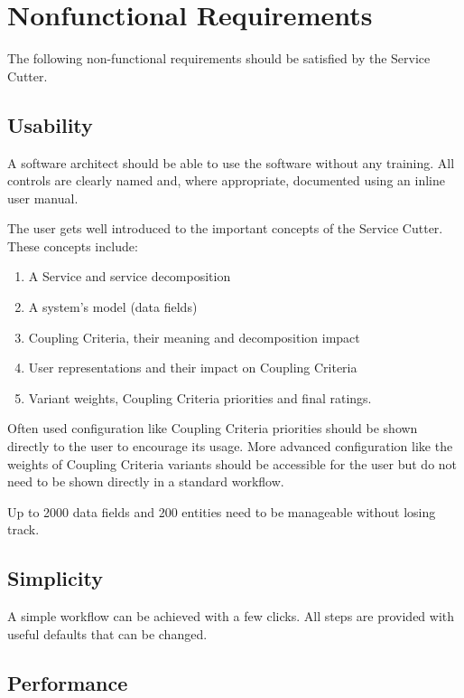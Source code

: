 \section{Nonfunctional Requirements}

The following non-functional requirements should be satisfied by the Service Cutter.

\subsection{Usability}
\label{sec:usability}

A software architect should be able to use the software without any training. All controls are clearly named and, where appropriate, documented using an inline user manual.

The user gets well introduced to the important concepts of the Service Cutter. These concepts include:

\begin{enumerate}
	\item A Service and service decomposition
	\item A system's model (data fields)
	\item Coupling Criteria, their meaning and decomposition impact
	\item User representations and their impact on Coupling Criteria
	\item Variant weights, Coupling Criteria priorities and final ratings.
\end{enumerate}

Often used configuration like Coupling Criteria priorities should be shown directly to the user to encourage its usage. More advanced configuration like the weights of Coupling Criteria variants should be accessible for the user but do not need to be shown directly in a standard workflow. 

Up to 2000 data fields and 200 entities need to be manageable without losing track.

\subsection{Simplicity}

A simple workflow can be achieved with a few clicks. All steps are provided with useful defaults that can be changed.

\subsection{Performance}

